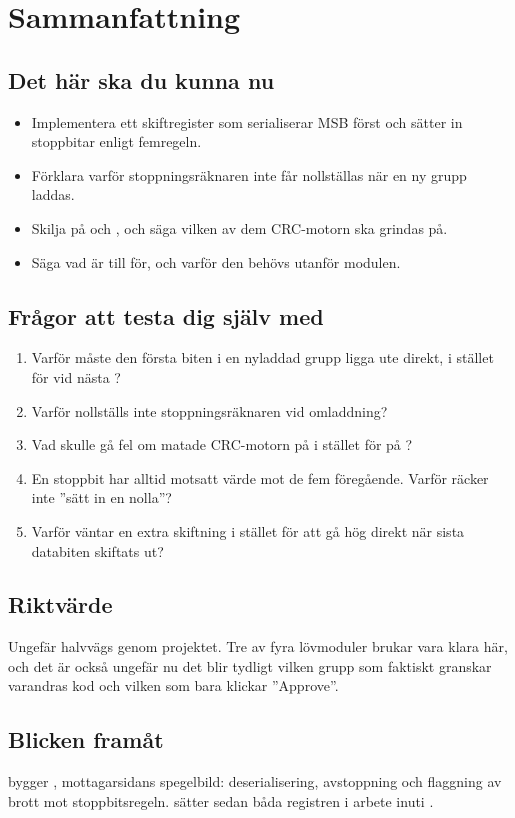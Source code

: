 
\section{Sammanfattning}
\label{c14:sec:review}

\subsection*{Det här ska du kunna nu}
\begin{itemize}
  \item Implementera ett skiftregister som serialiserar MSB först och sätter in stoppbitar enligt
    femregeln.
  \item Förklara varför stoppningsräknaren inte får nollställas när en ny grupp laddas.
  \item Skilja på  och , och säga vilken av dem CRC-motorn ska
    grindas på.
  \item Säga vad  är till för, och varför den behövs utanför modulen.
\end{itemize}

\subsection*{Frågor att testa dig själv med}
\begin{enumerate}
  \item Varför måste den första biten i en nyladdad grupp ligga ute direkt, i stället för vid nästa
    ?
  \item Varför nollställs inte stoppningsräknaren vid omladdning?
  \item Vad skulle gå fel om  matade CRC-motorn på  i stället
    för på ?
  \item En stoppbit har alltid motsatt värde mot de fem föregående. Varför räcker inte ”sätt in en
    nolla”?
  \item Varför väntar  en extra skiftning i stället för att gå hög direkt när sista
    databiten skiftats ut?
\end{enumerate}

\subsection*{Riktvärde}
Ungefär halvvägs genom projektet. Tre av fyra lövmoduler brukar vara klara här, och det är också
ungefär nu det blir tydligt vilken grupp som faktiskt granskar varandras kod och vilken som bara
klickar ”Approve”.

\subsection*{Blicken framåt}
 bygger , mottagarsidans spegelbild: deserialisering, avstoppning
och flaggning av brott mot stoppbitsregeln.  sätter sedan båda registren i arbete
inuti .
